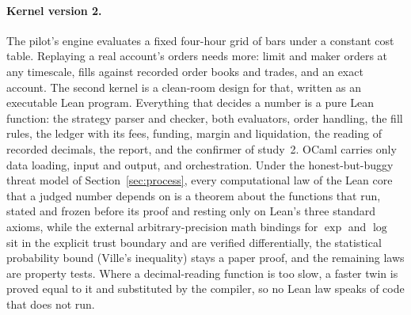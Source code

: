 \documentclass[11pt]{article}
\begin{document}
\paragraph{Kernel version 2.} The pilot's engine evaluates a fixed four-hour grid of bars under a constant cost table. Replaying a real account's orders needs more: limit and maker orders at any timescale, fills against recorded order books and trades, and an exact account. The second kernel is a clean-room design for that, written as an executable Lean program. Everything that decides a number is a pure Lean function: the strategy parser and checker, both evaluators, order handling, the fill rules, the ledger with its fees, funding, margin and liquidation, the reading of recorded decimals, the report, and the confirmer of study~2. OCaml carries only data loading, input and output, and orchestration. Under the honest-but-buggy threat model of Section~\ref{sec:process}, every computational law of the Lean core that a judged number depends on is a theorem about the functions that run, stated and frozen before its proof and resting only on Lean's three standard axioms, while the external arbitrary-precision math bindings for $\exp$ and $\log$ sit in the explicit trust boundary and are verified differentially, the statistical probability bound (Ville's inequality) stays a paper proof, and the remaining laws are property tests. Where a decimal-reading function is too slow, a faster twin is proved equal to it and substituted by the compiler, so no Lean law speaks of code that does not run.
\end{document}
